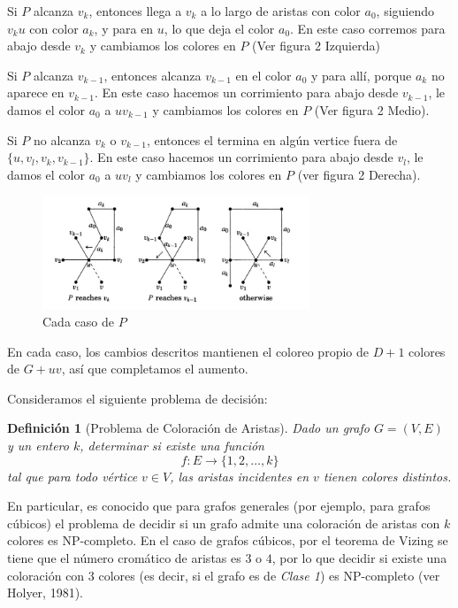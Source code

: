 \documentclass[a4paper]{article}
\newtheorem{definition}{Definición}
\begin{document}
Si $P$ alcanza $v_k$, entonces llega a $v_k$ a lo largo de aristas con color $a_0$, siguiendo $v_ku$ con color $a_k$, y para en $u$, lo que deja el color $a_0$. En este caso corremos para abajo desde $v_k$ y cambiamos los colores en $P$ (Ver figura 2 Izquierda)

Si $P$ alcanza $v_{k-1}$, entonces alcanza $v_{k-1}$ en el color $a_0$ y para all\'i, porque $a_k$ no aparece en $v_{k-1}$. En este caso hacemos un corrimiento para abajo desde $v_{k-1}$, le damos el color $a_0$ a $uv_{k-1}$ y cambiamos los colores en $P$ (Ver figura 2 Medio).

Si $P$ no alcanza $v_k$ o $v_{k-1}$, entonces el termina en alg\'un vertice fuera de $\{u, v_l, v_k, v_{k-1}\}$. En este caso hacemos un corrimiento para abajo desde $v_l$, le damos el color $a_0$ a $uv_l$ y cambiamos los colores en $P$ (ver figura 2 Derecha).
\begin{figure}
    \begin{center}
        \includegraphics[width=8cm]{image2.png}
        \caption{Cada caso de $P$} 
    \end{center}
\end{figure}
En cada caso, los cambios descritos mantienen el coloreo propio de $D+1$ colores de $G + uv$, as\'i que completamos el aumento.

Consideramos el siguiente problema de decisión:

\begin{definition}[Problema de Coloración de Aristas]
Dado un grafo $G=(V,E)$ y un entero $k$, determinar si existe una función
\[
f : E \to \{1,2,\dots,k\}
\]
tal que para todo vértice $v\in V$, las aristas incidentes en $v$ tienen colores distintos.
\end{definition}

En particular, es conocido que para grafos generales (por ejemplo, para grafos cúbicos) el problema de decidir si un grafo admite una coloración de aristas con $k$ colores es NP-completo. En el caso de grafos cúbicos, por el teorema de Vizing se tiene que el número cromático de aristas es $3$ o $4$, por lo que decidir si existe una coloración con $3$ colores (es decir, si el grafo es de \emph{Clase 1}) es NP-completo (ver Holyer, 1981).
\end{document}
